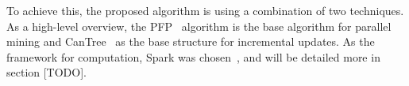 To achieve this, the proposed algorithm is using a combination of two techniques. As a high-level overview, the PFP~\cite{li2008pfp} algorithm is the base algorithm for parallel mining and CanTree~\cite{leung2005cantree} as the base structure for incremental updates.  As the framework for computation, Spark was chosen~\cite{spark},  and will be detailed more in section [TODO]. 
\fi

\iffalse
It is important to mention that a similar approach was already developed by~\cite{song2017} at 2017, but was added as a reference after implementation and results, and we will discuss and compare to this paper in details in section [TODO]. 
\fi
